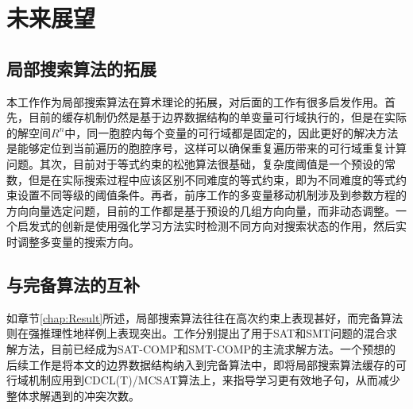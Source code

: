 \section{未来展望}
\subsection{局部搜索算法的拓展}
本工作作为局部搜索算法在算术理论的拓展，对后面的工作有很多启发作用。首先，目前的缓存机制仍然是基于边界数据结构的单变量可行域执行的，但是在实际的解空间$R^n$中，同一胞腔内每个变量的可行域都是固定的，因此更好的解决方法是能够定位到当前遍历的胞腔序号，这样可以确保重复遍历带来的可行域重复计算问题。其次，目前对于等式约束的松弛算法很基础，复杂度阈值是一个预设的常数，但是在实际搜索过程中应该区别不同难度的等式约束，即为不同难度的等式约束设置不同等级的阈值条件。再者，前序工作的多变量移动机制涉及到参数方程的方向向量选定问题，目前的工作都是基于预设的几组方向向量，而非动态调整。一个启发式的创新是使用强化学习方法实时检测不同方向对搜索状态的作用，然后实时调整多变量的搜索方向。

\subsection{与完备算法的互补}
如章节\ref{chap:Result}所述，局部搜索算法往往在高次约束上表现甚好，而完备算法则在强推理性地样例上表现突出。工作\cite{CaiZ21,hybridSMT,BoostMcsat}分别提出了用于SAT和SMT问题的混合求解方法，目前已经成为SAT-COMP和SMT-COMP的主流求解方法。一个预想的后续工作是将本文的边界数据结构纳入到完备算法中，即将局部搜索算法缓存的可行域机制应用到CDCL(T)/MCSAT算法上，来指导学习更有效地子句，从而减少整体求解遇到的冲突次数。